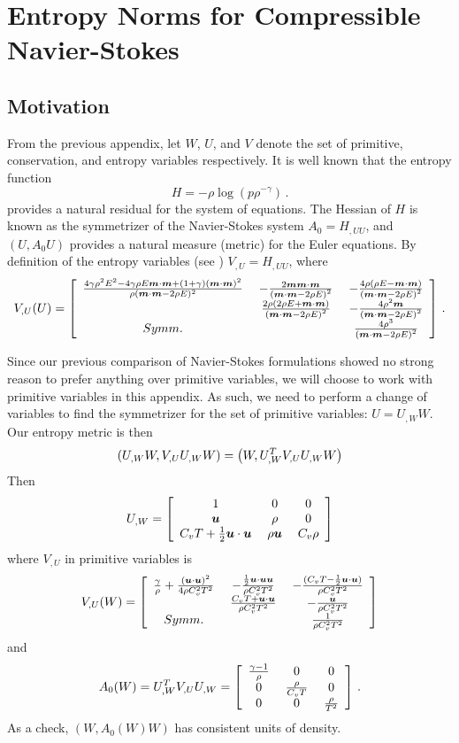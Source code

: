 \documentclass[Dissertation.tex]{subfiles}
\begin{document}
\chapter{Entropy Norms for Compressible Navier-Stokes}
\label{sec:EntropyNorm}
\section{Motivation}

From the previous appendix, let $W$, $U$, and $V$ denote the set of primitive, conservation, and
entropy variables respectively.
It is well known that the entropy function
\[
H=-\rho\log(p\rho^{-\gamma})\,.
\]
provides a natural residual for the system of equations.
The Hessian of $H$ is known as the symmetrizer of the Navier-Stokes system
$A_0=H_{,UU}$, and $(U,A_0U)$ provides a 
natural measure (metric) for the Euler equations.
By definition of the entropy variables (see \cite{HughesEntropyVariables}) $V_{,U}=H_{,UU}$, where
\[
V_{,U}(U)=\left[ \begin{array}{ccc} \frac{4\gamma\rho^2E^2-4\gamma\rho E\boldsymbol m\cdot\boldsymbol m+(1+\gamma)(\boldsymbol m\cdot\boldsymbol m)^2}{\rho(\boldsymbol m\cdot\boldsymbol m-2\rho E)^2}\; & -\frac{2\boldsymbol m\boldsymbol m\cdot\boldsymbol m}{\left( \boldsymbol m\cdot\boldsymbol m-2\rho E \right)^2}\; & -\frac{4\rho(\rho E-\boldsymbol m\cdot\boldsymbol m)}{\left( \boldsymbol m\cdot\boldsymbol m-2\rho E \right)^2}\\ \; & \frac{2\rho(2\rho E+\boldsymbol m\cdot\boldsymbol m)}{\left( \boldsymbol m\cdot\boldsymbol m-2\rho E \right)^2}\; & -\frac{4\rho^2\boldsymbol m}{\left( \boldsymbol m\cdot\boldsymbol m-2\rho E \right)^2}\\ Symm.\; & \; & \frac{4\rho^3}{\left( \boldsymbol m\cdot\boldsymbol m-2\rho E \right)^2}\\ \end{array} \right]\,.
\]

Since our previous comparison of Navier-Stokes formulations showed no strong reason to 
prefer anything over primitive variables, we will choose to work with primitive variables 
in this appendix. 
As such, we need to perform a change of variables to find the symmetrizer for the set of primitive variables:
$U=U_{,W}W$.
Our entropy metric is then
\[
\left( U_{,W} W,V_{,U}U_{,W} W \right)=\left(  W,U_{,W}^TV_{,U}U_{,W} W \right)
\]
Then
\[
U_{,W}=\left[ \begin{array}{ccc} 1\; & 0\; & 0\\ \boldsymbol u\; & \rho\; & 0\\ C_vT+\frac{1}{2}\boldsymbol u\cdot\boldsymbol u\; & \rho\boldsymbol u\; & C_v\rho\\ \end{array} \right]
\]
where $V_{,U}$ in primitive variables is
\[
V_{,U}(W)=\left[ \begin{array}{ccc} \frac{\gamma}{\rho}+\frac{(\boldsymbol u\cdot\boldsymbol u)^2}{4\rho C_v^2 T^2}\; & -\frac{\frac{1}{2}\boldsymbol u\cdot\boldsymbol u\boldsymbol u}{\rho C_v^2 T^2}\; & -\frac{(C_v T-\frac{1}{2}\boldsymbol u\cdot\boldsymbol u)}{\rho C_v^2 T^2}\\ \; & \frac{C_v T+\boldsymbol u\cdot\boldsymbol u}{\rho C_v^2 T^2}\; & -\frac{\boldsymbol u}{\rho C_v^2 T^2}\\ Symm.\; & \; & \frac{1}{\rho C_v^2 T^2}\\ \end{array} \right]
\]
and
\[
A_0(W)=U_{,W}^TV_{,U}U_{,W}=\left[ \begin{array}{ccc} \frac{\gamma-1}{\rho}\; & 0\; & 0\\ 0\; & \frac{\rho}{C_v T}\; & 0\\ 0\; & 0\; & \frac{\rho}{T^2}\\ \end{array} \right]\,.
\]
As a check, $(W,A_0(W)W)$ has consistent units of density.
\end{document}
